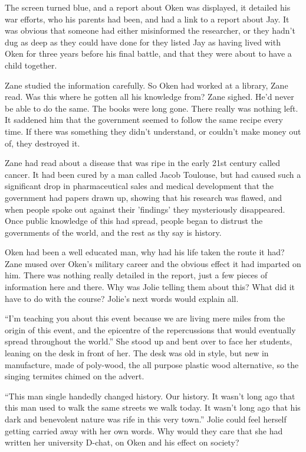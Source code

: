 The screen turned blue, and a report about Oken was displayed, it detailed his war efforts, who his parents had been, and had a link to a report about Jay.  It was obvious that someone had either misinformed the researcher, or they hadn't dug as deep as they could have done for they listed Jay as having lived with Oken for three years before his final battle, and that they were about to have a child together.

Zane studied the information carefully.  So Oken had worked at a library, Zane read.  Was this where he gotten all his knowledge from?  Zane sighed.  He'd never be able to do the same.  The books were long gone.  There really was nothing left.  It saddened him that the government seemed to follow the same recipe every time.  If there was something they didn't understand, or couldn't make money out of, they destroyed it.  

Zane had read about a disease that was ripe in the early 21st century called cancer.  It had been cured by a man called Jacob Toulouse, but had caused such a significant drop in pharmaceutical sales and medical development that the government had papers drawn up, showing that his research was flawed, and when people spoke out against their 'findings' they mysteriously disappeared.  Once public knowledge of this had spread, people began to distrust the governments of the world, and the rest as thy say is history.

Oken had been a well educated man, why had his life taken the route it had?  Zane mused over Oken's military career and the obvious effect it had imparted on him.  There was nothing really detailed in the report, just a few pieces of information here and there.  Why was Jolie telling them about this?  What did it have to do with the course?  Jolie's next words would explain all.

``I'm teaching you about this event because we are living mere miles from the origin of this event, and the epicentre of the repercussions that would eventually spread throughout the world.''  She stood up and bent over to face her students, leaning on the desk in front of her.  The desk was old in style, but new in manufacture, made of poly-wood, the all purpose plastic wood alternative, so the singing termites chimed on the advert.

``This man single handedly changed history.  Our history.  It wasn't long ago that this man used to walk the same streets we walk today.  It wasn't long ago that his dark and benevolent nature was rife in this very town.''  Jolie could feel herself getting carried away with her own words.  Why would they care that she had written her university D-chat, on Oken and his effect on society? 

